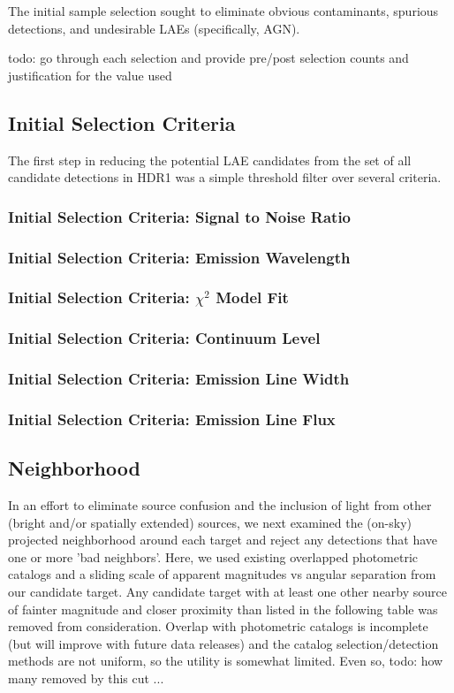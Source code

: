 \documentclass{aastex62}
\begin{document}
The initial sample selection sought to eliminate obvious contaminants, spurious detections, and undesirable LAEs (specifically, AGN).

todo: go through each selection and provide pre/post selection counts and justification for the value used

\subsection{Initial Selection Criteria}
The first step in reducing the potential LAE candidates from the set of all candidate detections in HDR1 was a simple threshold filter over several criteria. 

\subsubsection{Initial Selection Criteria: Signal to Noise Ratio}

\subsubsection{Initial Selection Criteria: Emission Wavelength}

\subsubsection{Initial Selection Criteria: $\chi ^{2}$ Model Fit}

\subsubsection{Initial Selection Criteria: Continuum Level}

\subsubsection{Initial Selection Criteria: Emission Line Width}

\subsubsection{Initial Selection Criteria: Emission Line Flux}

\subsection{Neighborhood}
In an effort to eliminate source confusion and the inclusion of light from other (bright and/or spatially extended) sources, we next examined the (on-sky) projected neighborhood around each target and reject any detections that have one or more 'bad neighbors'. Here, we used existing overlapped photometric catalogs and a sliding scale of apparent magnitudes vs angular separation from our candidate target. Any candidate target with at least one other nearby source of fainter magnitude and closer proximity than listed in the following table was removed from consideration. Overlap with photometric catalogs is incomplete (but will improve with future data releases) and the catalog selection/detection methods are not uniform, so the utility is somewhat limited. Even so, { \color{red} todo: how many removed by this cut ...}
\end{document}

